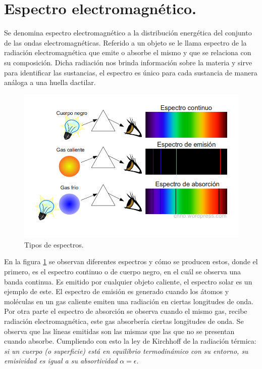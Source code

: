 \section{Espectro electromagnético.}
Se denomina espectro electromagnético a la distribución energética del conjunto de las ondas electromagnéticas. Referido a un objeto se le llama espectro de la radiación electromagnética que emite o absorbe el mismo y que se relaciona con su composición. Dicha radiación nos brinda información sobre la materia y sirve para identificar las sustancias, el espectro es único para cada sustancia de manera análoga a una huella dactilar. 
\begin{figure}[h!] %
	\centering
	\includegraphics[width=1\linewidth]{Imagenes/espectros_absorcion_y_emision}
	\caption{Tipos de espectros. \cite{FisicaCh}}
	\label{fig:esq_espectro01}
\end{figure}

En la figura \ref{fig:esq_espectro01} se observan diferentes espectros y cómo se producen estos, donde el primero, es el espectro continuo o de cuerpo negro, en el cuál se observa una banda continua. Es emitido por cualquier objeto caliente, el espectro solar es un ejemplo de este. El espectro de emisión es generado cuando los átomos y moléculas en un gas caliente emiten una radiación en ciertas longitudes de onda. Por otra parte el espectro de absorción se observa cuando el mismo gas, recibe radiación electromagnética, este gas absorbería ciertas longitudes de onda. Se observa que las líneas emitidas son las mismas que las que no se presentan cuando absorbe. Cumpliendo con esto la ley de Kirchhoff de la radiación térmica: \emph{si un cuerpo (o superficie) está en equilibrio termodinámico con su entorno, su emisividad es igual a su absortividad} $\alpha = \epsilon$.

